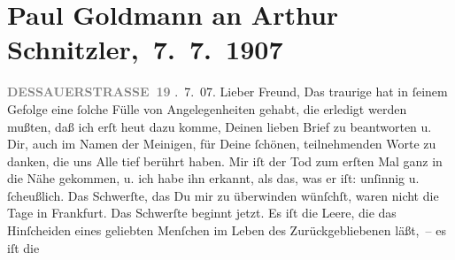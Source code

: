 

         
         \renewcommand{\erwaehntePersonen}{Personen: Paul Goldmann, Clementine Goldmann, Fedor Mamroth, Olga Schnitzler}
         \renewcommand{\erwaehnteOrte}{Orte: Berlin, Dessauer Straße, Frankfurt am Main, Marienbad, Wien}
         \renewcommand{\erwaehnteWerke}{}
               \section[ Paul Goldmann an Arthur Schnitzler, 7. 7. 1907]{ Paul Goldmann an Arthur Schnitzler, 7. 7. 1907}\nopagebreak{}\rehead{ }\begin{ledgroupsized}[t]{13cm}\normalsize\beginnumbering \toendnotes[C]{\smallbreak\pagebreak[2]} 
\toendnotes[C]{\smallbreak}\pstart
           \noindent{}\raggedleft{}{\pb}\textcolor{gray}{\textbf{DESSAUERSTRASSE 19}}\pend
           . 7. 07.\pend
           \pstart{}Lieber Freund,\pend\pstart
           Das traurige \label{K_L03254-1v}\label{K_L03254-1h} hat in
               ſeinem Gefolge eine ſolche Fülle von Angelegenheiten gehabt, die erledigt werden
               mußten, daß ich erſt heut dazu komme, Deinen lieben
               Brief zu beantworten u. Dir, auch im Namen der Meinigen, für Deine ſchönen,
               teilnehmenden Worte zu danken, die uns Alle tief berührt haben.\pend
           \pstart
           Mir iſt der Tod zum erſten Mal ganz in die Nähe gekommen, {\pb}u. ich habe ihn erkannt, als das, was er iſt:
               unſinnig u. ſcheußlich.\pend
           \pstart
           Das Schwerſte, das Du mir zu überwinden wünſchſt, waren nicht die Tage in Frankfurt. Das Schwerſte beginnt jetzt. Es iſt die
               Leere, die das Hinſcheiden eines geliebten Menſchen im Leben des Zurückgebliebenen läßt, – es iſt die

\end{ledgroupsized}
